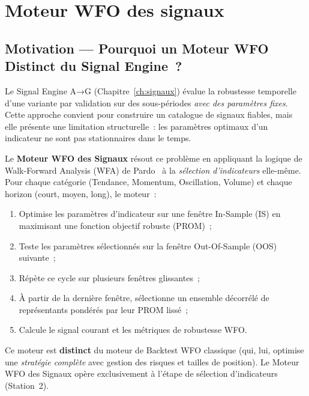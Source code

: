 \chapter{Moteur WFO des signaux}
\label{ch:wfo}

\section{Motivation — Pourquoi un Moteur WFO Distinct du Signal Engine~?}
\label{sec:wfo_motivation}

Le Signal Engine A→G (Chapitre~\ref{ch:signaux}) évalue la robustesse temporelle
d'une variante par validation sur des sous-périodes \emph{avec des paramètres fixes}.
Cette approche convient pour construire un catalogue de signaux fiables, mais elle
présente une limitation structurelle~: les paramètres optimaux d'un indicateur
ne sont pas stationnaires dans le temps.

Le \textbf{Moteur WFO des Signaux} résout ce problème en appliquant la logique de
Walk-Forward Analysis (WFA) de Pardo~\cite{pardo2008} à la \emph{sélection d'indicateurs}
elle-même. Pour chaque catégorie (Tendance, Momentum, Oscillation, Volume) et chaque
horizon (court, moyen, long), le moteur~:

\begin{enumerate}
    \item Optimise les paramètres d'indicateur sur une fenêtre In-Sample (IS) en
    maximisant une fonction objectif robuste (PROM)~;
    \item Teste les paramètres sélectionnés sur la fenêtre Out-Of-Sample (OOS) suivante~;
    \item Répète ce cycle sur plusieurs fenêtres glissantes~;
    \item À partir de la dernière fenêtre, sélectionne un ensemble décorrélé de
    représentants pondérés par leur PROM lissé~;
    \item Calcule le signal courant et les métriques de robustesse WFO.
\end{enumerate}

Ce moteur est \textbf{distinct} du moteur de Backtest WFO classique (qui, lui, optimise
une \emph{stratégie complète} avec gestion des risques et tailles de position). Le
Moteur WFO des Signaux opère exclusivement à l'étape de sélection d'indicateurs
(Station~2).

